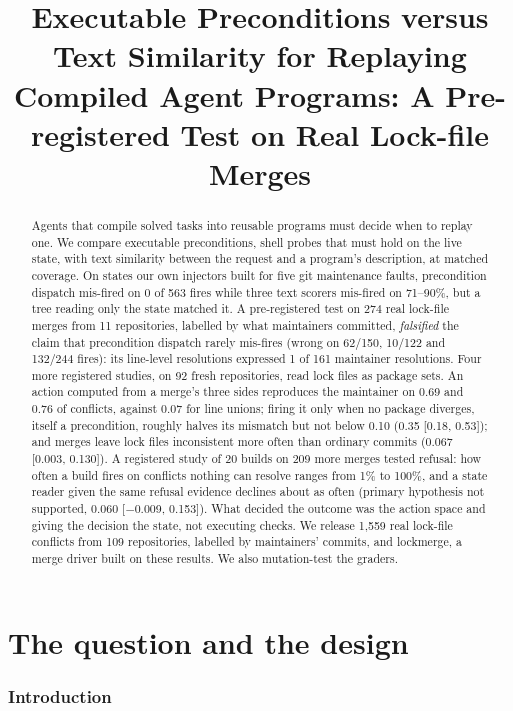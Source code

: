 \documentclass[11pt]{article}
\title{Executable Preconditions versus Text Similarity for Replaying Compiled Agent
Programs: A Pre-registered Test on Real Lock-file Merges}
\date{}
\begin{document}
\maketitle

\begin{abstract}
Agents that compile solved tasks into reusable programs must decide when to replay one. We
compare executable preconditions, shell probes that must hold on the live state, with text
similarity between the request and a program's description, at matched coverage. On states our
own injectors built for five git maintenance faults, precondition dispatch mis-fired on 0 of 563
fires while three text scorers mis-fired on 71--90\%, but a tree reading only the state matched
it. A pre-registered test on 274 real lock-file merges from 11 repositories, labelled by what
maintainers committed, \emph{falsified} the claim that precondition dispatch rarely mis-fires
(wrong on 62/150, 10/122 and 132/244 fires): its line-level resolutions expressed 1 of 161
maintainer resolutions. Four more registered studies, on 92 fresh repositories, read lock files
as package sets. An action computed from a merge's three sides reproduces the maintainer on 0.69
and 0.76 of conflicts, against 0.07 for line unions; firing it only when no package diverges,
itself a precondition, roughly halves its mismatch but not below 0.10 (0.35 [0.18, 0.53]); and
merges leave lock files inconsistent more often than ordinary commits (0.067 [0.003, 0.130]). A
registered study of 20 builds on 209 more merges tested refusal: how often a build fires on
conflicts nothing can resolve ranges from 1\% to 100\%, and a state reader given the same refusal
evidence declines about as often (primary hypothesis not supported, 0.060 [$-$0.009, 0.153]).
What decided the outcome was the action space and giving the decision the state, not executing
checks. We release 1,559 real lock-file conflicts from 109 repositories, labelled by
maintainers' commits, and lockmerge, a merge driver built on these results. We also
mutation-test the graders.
\end{abstract}

\clearpage
{\setcounter{tocdepth}{1}\tableofcontents}

\clearpage
\part{The question and the design}

\section{Introduction}
\label{sec:intro}
\end{document}
